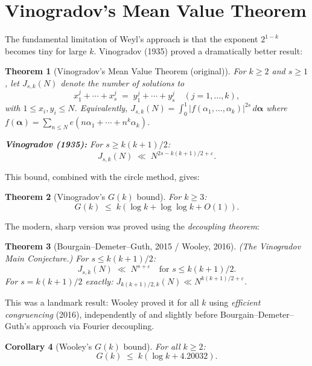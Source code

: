\documentclass[12pt,a4paper]{amsart}
\newtheorem{theorem}{Theorem}[section]
\newtheorem{corollary}[theorem]{Corollary}
\theoremstyle{definition}
\newcommand{\eq}[1]{e\!\left(#1\right)}
\begin{document}
\section{Vinogradov's Mean Value Theorem}
\label{sec:vinogradov_mvt}

The fundamental limitation of Weyl's approach is that the exponent
$2^{1-k}$ becomes tiny for large $k$.  Vinogradov (1935) proved a
dramatically better result:

\begin{theorem}[Vinogradov's Mean Value Theorem (original)]\label{thm:vmvt_original}
  For $k \geq 2$ and $s \geq 1$, let $J_{s,k}(N)$ denote the number of
  solutions to
  \[
    x_1^j + \cdots + x_s^j \;=\; y_1^j + \cdots + y_s^j \quad (j = 1, \ldots, k),
  \]
  with $1 \leq x_i, y_i \leq N$.  Equivalently,
  $J_{s,k}(N) = \int_0^1 |f(\alpha_1, \ldots, \alpha_k)|^{2s}\, d\boldsymbol\alpha$
  where $f(\boldsymbol\alpha) = \sum_{n \leq N} \eq{n\alpha_1 + \cdots + n^k \alpha_k}$.

  \textbf{Vinogradov (1935):} For $s \geq k(k+1)/2$:
  \[
    J_{s,k}(N) \;\ll\; N^{2s - k(k+1)/2 + \varepsilon}.
  \]
\end{theorem}

This bound, combined with the circle method, gives:

\begin{theorem}[Vinogradov's $G(k)$ bound]\label{thm:vinogradov_Gk}
  For $k \geq 3$:
  \[
    G(k) \;\leq\; k(\log k + \log\log k + O(1)).
  \]
\end{theorem}

The modern, sharp version was proved using the \emph{decoupling theorem}:

\begin{theorem}[Bourgain--Demeter--Guth, 2015 / Wooley, 2016]\label{thm:bdg}
  (The Vinogradov Main Conjecture.)  For $s \leq k(k+1)/2$:
  \[
    J_{s,k}(N) \;\ll\; N^{s + \varepsilon}
    \quad \text{for } s \leq k(k+1)/2.
  \]
  For $s = k(k+1)/2$ exactly:
  $J_{k(k+1)/2, k}(N) \ll N^{k(k+1)/2 + \varepsilon}$.
\end{theorem}

This was a landmark result: Wooley proved it for all $k$ using
\emph{efficient congruencing} (2016), independently of and slightly
before Bourgain--Demeter--Guth's approach via Fourier decoupling.

\begin{corollary}[Wooley's $G(k)$ bound]\label{cor:wooley}
  For all $k \geq 2$:
  \[
    G(k) \;\leq\; k(\log k + 4.20032).
  \]
\end{corollary}
\end{document}
